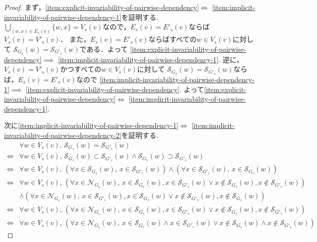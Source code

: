 \begin{proof}
  まず，\ref{item:explicit-invariability-of-pairwise-dependency}$\iff$
  \ref{item:implicit-invariability-of-pairwise-dependency-1}を証明する.
  $\bigcup_{(w,x)\in E_s(v)}\{w,x\}=V_s(v)$なので，$E_s(v)=E'_s(v)$ならば$V_s(v)=V'_s(v)$．
  また，$E_s(v)=E'_s(v)$ならばすべての$w\in V_s(v)$に対して
  $\mathcal{S}_{G_s}(w)=\mathcal{S}_{G'_s}(w)$である．よって
  \ref{item:explicit-invariability-of-pairwise-dependency}$\implies$
  \ref{item:implicit-invariability-of-pairwise-dependency-1}.
  逆に，$V_s(v)=V'_s(v)$かつすべての$w\in V_s(v)$に対して
  $\mathcal{S}_{G_s}(w)=\mathcal{S}_{G'_s}(w)$ならば，$E_s(v)=E'_s(v)$なので
  \ref{item:implicit-invariability-of-pairwise-dependency-1}$\implies$
  \ref{item:explicit-invariability-of-pairwise-dependency}.
  よって\ref{item:explicit-invariability-of-pairwise-dependency}$\iff$
  \ref{item:implicit-invariability-of-pairwise-dependency-1}.

  次に\ref{item:implicit-invariability-of-pairwise-dependency-1}$\iff$
  \ref{item:implicit-invariability-of-pairwise-dependency-2}を証明する.
  \begin{equation*}
    \begin{aligned}
      &\forall w\in V_s(v),\,\mathcal{S}_{G_s}(w)=\mathcal{S}_{G'_s}(w)\\
      \iff&\forall w\in V_s(v),\,\mathcal{S}_{G_s}(w)\subset\mathcal{S}_{G'_s}(w)
      \land\mathcal{S}_{G_s}(w)\supset\mathcal{S}_{G'_s}(w)\\
      \iff&\forall w\in V_s(v),\,\left(\forall x\in\mathcal{S}_{G_s}(w),\,x\in\mathcal{S}_{G'_s}(w)\right)
      \land\left(\forall x\in\mathcal{S}_{G'_s}(w),\,x\in\mathcal{S}_{G_s}(w)\right)\\
      \iff&\forall w\in V_s(v),\,\left(\forall x\in\mathcal{N}_{G_s}(w),\,
      x\in\mathcal{S}_{G_s}(w),x\in\mathcal{S}_{G'_s}(w)
      \lor x\notin\mathcal{S}_{G_s}(w),x\notin\mathcal{S}_{G'_s}(w)\right)\\
      &\land\left(\forall x\in\mathcal{N}_{G_s}(w),\,
      x\in\mathcal{S}_{G'_s}(w),x\in\mathcal{S}_{G_s}(w)
      \lor x\notin\mathcal{S}_{G'_s}(w),x\notin\mathcal{S}_{G_s}(w)\right)\\
      \iff&\forall w\in V_s(v),\,\left(\forall x\in\mathcal{N}_{G_s}(w),\,
      x\in\mathcal{S}_{G_s}(w),x\in\mathcal{S}_{G'_s}(w)
      \lor x\notin\mathcal{S}_{G_s}(w),x\notin\mathcal{S}_{G'_s}(w)\right)\\
      \iff&\forall w\in V_s(v),\,\left(\forall x\in\mathcal{N}_{G_s}(w),\,
      x\in\mathcal{S}_{G_s}(w)\land x\in\mathcal{S}_{G'_s}(w)
      \lor x\notin\mathcal{S}_{G_s}(w)\land x\notin\mathcal{S}_{G'_s}(w)\right)
    \end{aligned}
  \end{equation*}
\end{proof}


